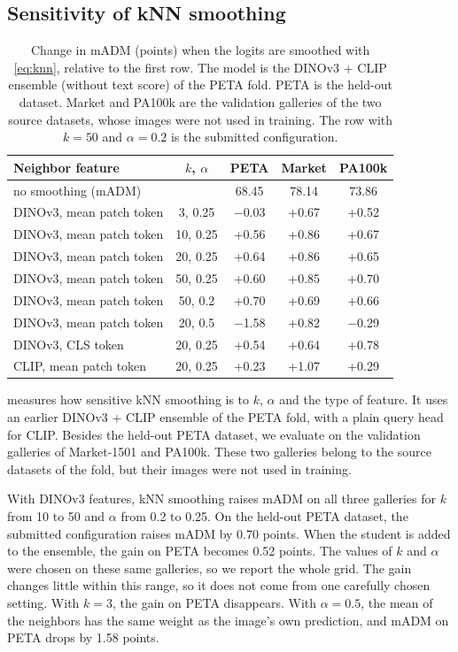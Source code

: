 \documentclass[10pt,twocolumn,letterpaper]{article}
\begin{document}
\subsection{Sensitivity of kNN smoothing}
\label{sec:knn}

\begin{table}[t]
\centering
\small
\setlength{\tabcolsep}{3.5pt}
\begin{tabular}{@{}lcccc@{}}
\toprule
Neighbor feature & $k$, $\alpha$ & PETA & Market & PA100k \\
\midrule
no smoothing (mADM) & & 68.45 & 78.14 & 73.86 \\
\midrule
DINOv3, mean patch token & 3, 0.25 & $-$0.03 & +0.67 & +0.52 \\
DINOv3, mean patch token & 10, 0.25 & +0.56 & +0.86 & +0.67 \\
DINOv3, mean patch token & 20, 0.25 & +0.64 & +0.86 & +0.65 \\
DINOv3, mean patch token & 50, 0.25 & +0.60 & +0.85 & +0.70 \\
DINOv3, mean patch token & 50, 0.2 & +0.70 & +0.69 & +0.66 \\
DINOv3, mean patch token & 20, 0.5 & $-$1.58 & +0.82 & $-$0.29 \\
DINOv3, CLS token & 20, 0.25 & +0.54 & +0.64 & +0.78 \\
CLIP, mean patch token & 20, 0.25 & +0.23 & +1.07 & +0.29 \\
\bottomrule
\end{tabular}
\caption{Change in mADM (points) when the logits are smoothed with \cref{eq:knn}, relative to the first row. The model is the DINOv3 + CLIP ensemble (without text score) of the PETA fold. PETA is the held-out dataset. Market and PA100k are the validation galleries of the two source datasets, whose images were not used in training. The row with $k=50$ and $\alpha=0.2$ is the submitted configuration.}
\label{tab:knn}
\end{table}

 measures how sensitive kNN smoothing is to $k$, $\alpha$ and the type of feature. It uses an earlier DINOv3 + CLIP ensemble of the PETA fold, with a plain query head for CLIP. Besides the held-out PETA dataset, we evaluate on the validation galleries of Market-1501 and PA100k. These two galleries belong to the source datasets of the fold, but their images were not used in training.

With DINOv3 features, kNN smoothing raises mADM on all three galleries for $k$ from 10 to 50 and $\alpha$ from 0.2 to 0.25. On the held-out PETA dataset, the submitted configuration raises mADM by 0.70 points. When the student is added to the ensemble, the gain on PETA becomes 0.52 points. The values of $k$ and $\alpha$ were chosen on these same galleries, so we report the whole grid. The gain changes little within this range, so it does not come from one carefully chosen setting. With $k=3$, the gain on PETA disappears. With $\alpha=0.5$, the mean of the neighbors has the same weight as the image's own prediction, and mADM on PETA drops by 1.58 points.
\end{document}
